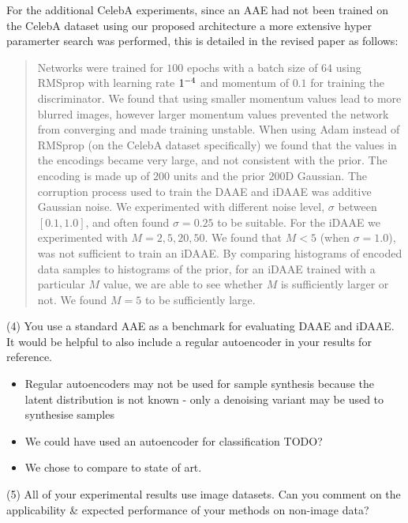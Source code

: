 \documentclass{article}
\begin{document}
{\color{red}
For the additional CelebA experiments, since an AAE had not been trained on the CelebA dataset using our proposed architecture a more extensive hyper paramerter search was performed, this is detailed in the revised paper as follows:

\begin{quote}
Networks were trained for $100$ epochs with a batch size of $64$ using RMSprop with learning rate $1 \time 10^{-4}$ and momentum of $0.1$ for training the discriminator. We found that using smaller momentum values lead to more blurred images, however larger momentum values prevented the network from converging and made training unstable. When using Adam instead of RMSprop (on the CelebA dataset specifically) we found that the values in the encodings became very large, and not consistent with the prior. The encoding is made up of $200$ units and the prior $200$D Gaussian. The corruption process used to train the DAAE and iDAAE was additive Gaussian noise. We experimented with different noise level, $\sigma$ between $[0.1, 1.0]$, and often found $\sigma=0.25$ to be suitable. For the iDAAE we experimented with $M=2, 5, 20, 50$. We found that $M < 5$ (when $\sigma=1.0$), was not sufficient to train an iDAAE. By comparing histograms of encoded data samples to histograms of the prior, for an iDAAE trained with a particular $M$ value, we are able to see whether $M$ is sufficiently larger or not. We found $M=5$ to be sufficiently large.
\end{quote}

 }

{\color{blue}
(4) You use a standard AAE as a benchmark for evaluating DAAE and iDAAE. It would be helpful to also include a regular autoencoder in your results for reference.}\newline

\begin{itemize}
    \item Regular autoencoders may not be used for sample synthesis because the latent distribution is not known - only a denoising variant may be used to synthesise samples
    \item We could have used an autoencoder for classification TODO? 
    \item We chose to compare to state of art.
\end{itemize}

{\color{blue}
(5) All of your experimental results use image datasets. Can you comment on the applicability \& expected performance of your methods on non-image data?}\newline
\end{document}
